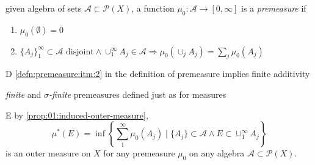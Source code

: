 \begin{defn}
  given algebra of sets ${\mathcal{A}\subset\mathscr{P}(X)}$,
  a function ${\mu_0:\mathcal{A}\rightarrow[0,\infty]}$ is a
  \emph{premeasure} if
  \begin{enumerate}[label=(\roman*)]
  \item
    ${\mu_0(\emptyset)=0}$
  \item\label{defn:premeasure:itm:2}
    ${\{A_j\}_1^\infty\subset\mathcal{A}\text{ disjoint}\land \cup_1^\infty A_j\in\mathcal{A} \Rightarrow \mu_0(\cup_j A_j) = \sum_j\mu_0(A_j)}$
  \end{enumerate}
\end{defn}

\begin{rem}{D}
  \ref{defn:premeasure:itm:2} in the definition of premeasure
  implies finite additivity
\end{rem}

\begin{defn}
  \emph{finite} and \emph{$\sigma$-finite} premeasures
  defined just as for measures
\end{defn}

\begin{rem}{E}\label{rem:01:premeasure2outer-measure}
  by \ref{prop:01:induced-outer-measure},
  \[
  \mu^*(E) = \inf\left\{\sum_1^\infty \mu_0(A_j)\mid
  \{A_j\}\subset\mathcal{A} \land E\subset\cup_1^\infty A_j\right\}
  \]
  is an outer measure on $X$ for any premeasure $\mu_0$
  on any algebra ${\mathcal{A}\subset\mathscr{P}(X)}$.
\end{rem}

